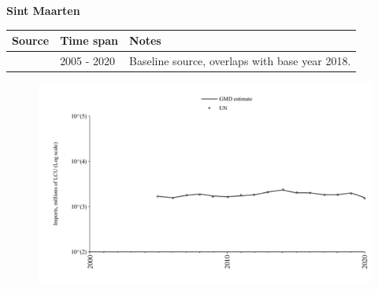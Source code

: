 \documentclass[12pt,a4paper,landscape]{article}
\begin{document}
\begin{adjustbox}{max totalsize={\paperwidth}{\paperheight},center}
\begin{minipage}[t][\textheight][t]{\textwidth}
\vspace*{0.5cm}
{}
\begin{center}
{\Large\bfseries Sint Maarten}
\end{center}
\vspace{0.5cm}
\begin{table}[H]
\centering
\small
\begin{tabular}{|l|l|l|}
\hline
\textbf{Source} & \textbf{Time span} & \textbf{Notes} \\
\hline
\rowcolor{white}\cite{UN}& 2005 - 2020 &Baseline source, overlaps with base year 2018.\\
\hline
\end{tabular}
\end{table}
\begin{figure}[H]
\centering
\includegraphics[width=\textwidth,height=0.6\textheight,keepaspectratio]{graphs/SXM_imports.pdf}
\end{figure}
\end{minipage}
\end{adjustbox}
\end{document}

